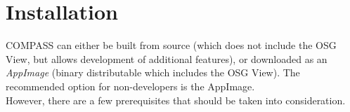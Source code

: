 \chapter{Installation}
\label{sec:installation}

COMPASS can either be built from source (which does not include the OSG View, but allows development of additional features), or downloaded as an \textit{AppImage} (binary distributable which includes the OSG View). The recommended option for non-developers is the AppImage. \\

However, there are a few prerequisites that should be taken into consideration.








